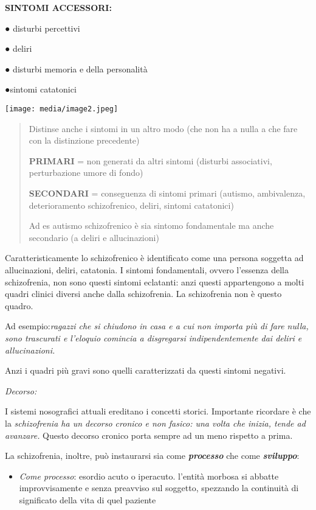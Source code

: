 \documentclass[]{article}
\begin{document}
\textbf{SINTOMI ACCESSORI:}

\textbf{●} disturbi percettivi

● deliri

● disturbi memoria e della personalità

●sintomi catatonici

\texttt{[image: media/image2.jpeg]}

\begin{quote}
Distinse anche i sintomi in un altro modo (che non ha a nulla a che fare
con la distinzione precedente)

\textbf{PRIMARI} = non generati da altri sintomi (disturbi associativi,
perturbazione umore di fondo)

\textbf{SECONDARI} = conseguenza di sintomi primari (autismo,
ambivalenza, deterioramento schizofrenico, deliri, sintomi catatonici)

Ad es autismo schizofrenico è sia sintomo fondamentale ma anche
secondario (a deliri e allucinazioni)
\end{quote}

Caratteristicamente lo schizofrenico è identificato come una persona
soggetta ad allucinazioni, deliri, catatonia. I sintomi fondamentali,
ovvero l'essenza della schizofrenia, non sono questi sintomi eclatanti:
anzi questi appartengono a molti quadri clinici diversi anche dalla
schizofrenia. La schizofrenia non è questo quadro.

Ad esempio:\emph{ragazzi che si chiudono in casa e a cui non importa più
di fare nulla, sono trascurati e l'eloquio comincia a disgregarsi
indipendentemente dai deliri e allucinazioni.}

Anzi i quadri più gravi sono quelli caratterizzati da questi sintomi
negativi.

\emph{\emph{Decorso:}}

I sistemi nosografici attuali ereditano i concetti storici. Importante
ricordare è che la \emph{schizofrenia ha un decorso cronico e non
fasico: una volta che inizia, tende ad avanzare.} Questo decorso cronico
porta sempre ad un meno rispetto a prima.

La schizofrenia, inoltre, può instaurarsi sia come
\textbf{\emph{processo}} che come \textbf{\emph{sviluppo}}:

\begin{itemize}
\item
  \emph{Come processo}: esordio acuto o iperacuto. l'entità morbosa si
  abbatte improvvisamente e senza preavviso sul soggetto, spezzando la
  continuità di significato della vita di quel paziente
\end{itemize}
\end{document}
